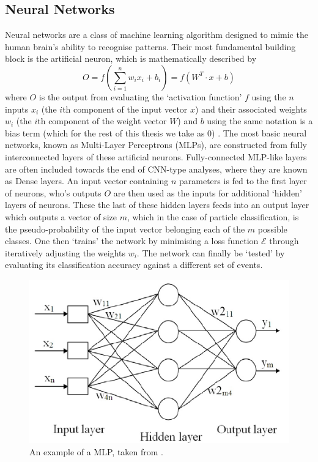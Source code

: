 \subsection{Neural Networks}
Neural networks are a class of machine learning algorithm designed to mimic the human brain's ability to recognise patterns. Their most fundamental building block is the artificial neuron, which is mathematically described by
\begin{equation}
O=\mathit{f}(\sum_{i=1}^{n}w_ix_i+b_i)=\mathit{f}(W^T\cdot x +b)
\end{equation}
where $O$ is the output from evaluating the `activation function' $\mathit{f}$ using the $n$ inputs $x_i$ (the $i$th component of the input vector $x$) and their associated weights $w_i$ (the $i$th component of the weight vector $W$) and $b$ using the same notation is a bias term (which for the rest of this thesis we take as 0) \cite{C++CNN}. The most basic neural networks, known as Multi-Layer Perceptrons (MLPs), are constructed from fully interconnected layers of these artificial neurons. Fully-connected MLP-like layers are often included towards the end of CNN-type analyses, where they are known as Dense layers. An input vector containing $n$ parameters is fed to the first layer of neurons, who's outputs $O$ are then used as the inputs for additional `hidden' layers of neurons. These the last of these hidden layers feeds into an output layer which outputs a vector of size $m$, which in the case of particle classification, is the pseudo-probability of the input vector belonging each of the $m$ possible classes. One then `trains' the network by minimising a loss function $\mathcal{E}$ through iteratively adjusting the weights $w_i$.
The network can finally be `tested' by evaluating its classification accuracy against a different set of events.
\begin{figure}[ht] 
        \centering \includegraphics[width=0.6\columnwidth]{figures/net.png}
        \caption{
                \label{fig:mlp} %
                An example of a MLP, taken from \cite{oil}.
        }
\end{figure}

